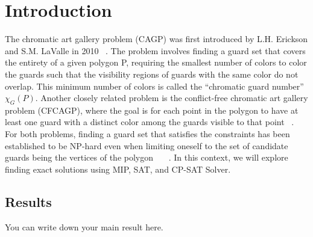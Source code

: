 \chapter{Introduction}
The chromatic art gallery problem (CAGP) was first introduced by L.H. Erickson and S.M. LaValle in 2010 ~\cite{erickson2010chromatic}. The problem involves finding a guard set that covers the entirety of a given polygon P, requiring the smallest number of colors to color the guards such that the visibility regions of guards with the same color do not overlap. This minimum number of colors is called the ``chromatic guard number'' $\chi_G(P)$. Another closely related problem is the conflict-free chromatic art gallery problem (CFCAGP), where the goal is for each point in the polygon to have at least one guard with a distinct color among the guards visible to that point ~\cite{bartschi2014conflict}. For both problems, finding a guard set that satisfies the constraints has been established to be NP-hard even when limiting oneself to the set of candidate guards being the vertices of the polygon ~\cite{fekete2014chromatic}~\cite{erickson2011many}~\cite{iwamoto2022vertex}. In this context, we will explore finding exact solutions using MIP, SAT, and CP-SAT Solver.

\section{Results}
You can write down your main result here.

